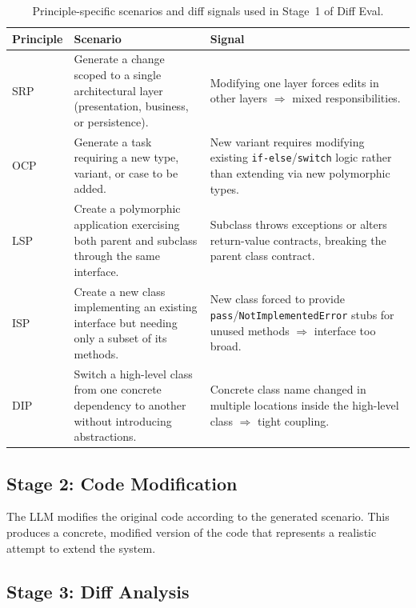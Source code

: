 \documentclass[12pt,a4paper,oneside]{report}
\begin{document}
\begin{table}[htbp]
\centering
\small
\begin{tabular}{@{}p{}p{}p{}@{}}
\toprule
\textbf{Principle} & \textbf{Scenario} & \textbf{Signal} \\
\midrule
SRP & Generate a change scoped to a single architectural layer (presentation, business, or persistence). & Modifying one layer forces edits in other layers $\Rightarrow$ mixed responsibilities. \\
\addlinespace
OCP & Generate a task requiring a new type, variant, or case to be added. & New variant requires modifying existing \texttt{if-else}/\texttt{switch} logic rather than extending via new polymorphic types. \\
\addlinespace
LSP & Create a polymorphic application exercising both parent and subclass through the same interface. & Subclass throws exceptions or alters return-value contracts, breaking the parent class contract. \\
\addlinespace
ISP & Create a new class implementing an existing interface but needing only a subset of its methods. & New class forced to provide \texttt{pass}/\texttt{NotImplementedError} stubs for unused methods $\Rightarrow$ interface too broad. \\
\addlinespace
DIP & Switch a high-level class from one concrete dependency to another without introducing abstractions. & Concrete class name changed in multiple locations inside the high-level class $\Rightarrow$ tight coupling. \\
\bottomrule
\end{tabular}
\caption{Principle-specific scenarios and diff signals used in Stage~1 of Diff Eval.}
\label{tbl:scenarios}
\end{table}

\subsection{Stage 2: Code Modification}

The LLM modifies the original code according to the generated scenario. This produces a concrete, modified version of the code that represents a realistic attempt to extend the system.

\subsection{Stage 3: Diff Analysis}
\end{document}

